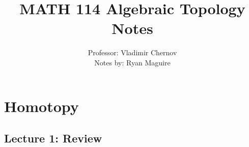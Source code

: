 \documentclass[oneside]{book}                                                  %
\begin{document}
    \title{MATH 114 Algebraic Topology Notes}
    \author{%
        Professor: Vladimir Chernov\\
        Notes by: Ryan Maguire%
    }
    \date{\vspace{-5ex}}
    \maketitle
    \tableofcontents
    \listoffigures
    \chapter{Homotopy}
        \section{Lecture 1: Review}
\end{document}

